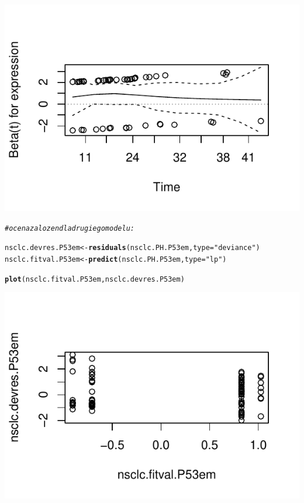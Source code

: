 \documentclass[10pt,a4paper]{article}\usepackage[]{graphicx}\usepackage[]{color}
\makeatletter
\def\maxwidth{ %
  \ifdim\Gin@nat@width>\linewidth
    \linewidth
  \else
    \Gin@nat@width
  \fi
}
\newcommand{\hlstr}[1]{\textcolor[rgb]{0.192,0.494,0.8}{#1}}%
\newcommand{\hlcom}[1]{\textcolor[rgb]{0.678,0.584,0.686}{\textit{#1}}}%
\newcommand{\hlstd}[1]{\textcolor[rgb]{0.345,0.345,0.345}{#1}}%
\newcommand{\hlkwb}[1]{\textcolor[rgb]{0.69,0.353,0.396}{#1}}%
\newcommand{\hlkwc}[1]{\textcolor[rgb]{0.333,0.667,0.333}{#1}}%
\newcommand{\hlkwd}[1]{\textcolor[rgb]{0.737,0.353,0.396}{\textbf{#1}}}%
\newenvironment{kframe}{%
 \def\at@end@of@kframe{}%
 \ifinner\ifhmode%
  \def\at@end@of@kframe{\end{minipage}}%
  \begin{minipage}{\columnwidth}%
 \fi\fi%
 \def\FrameCommand##1{\hskip\@totalleftmargin \hskip-\fboxsep
 \colorbox{shadecolor}{##1}\hskip-\fboxsep
     \hskip-\linewidth \hskip-\@totalleftmargin \hskip\columnwidth}%
 \MakeFramed {\advance\hsize-\width
   \@totalleftmargin\z@ \linewidth\hsize
   \@setminipage}}%
 {\par\unskip\endMakeFramed%
 \at@end@of@kframe}
\newenvironment{knitrout}{}{} %
\makeatother
\begin{document}
\begin{knitrout}
{\centering \includegraphics[width=\maxwidth]{figure/unnamed-chunk-15} 

}


\begin{kframe}\begin{alltt}
\hlcom{# ocena zalozen dla drugiego modelu:}

\hlstd{nsclc.devres.P53em} \hlkwb{<-} \hlkwd{residuals}\hlstd{(nsclc.PH.P53em,} \hlkwc{type} \hlstd{=} \hlstr{"deviance"}\hlstd{)}
\hlstd{nsclc.fitval.P53em} \hlkwb{<-} \hlkwd{predict}\hlstd{(nsclc.PH.P53em,} \hlkwc{type} \hlstd{=} \hlstr{"lp"}\hlstd{)}

\hlkwd{plot}\hlstd{(nsclc.fitval.P53em, nsclc.devres.P53em)}
\end{alltt}
\end{kframe}

{\centering \includegraphics[width=\maxwidth]{figure/unnamed-chunk-16} 

}
\end{knitrout}
\end{document}
